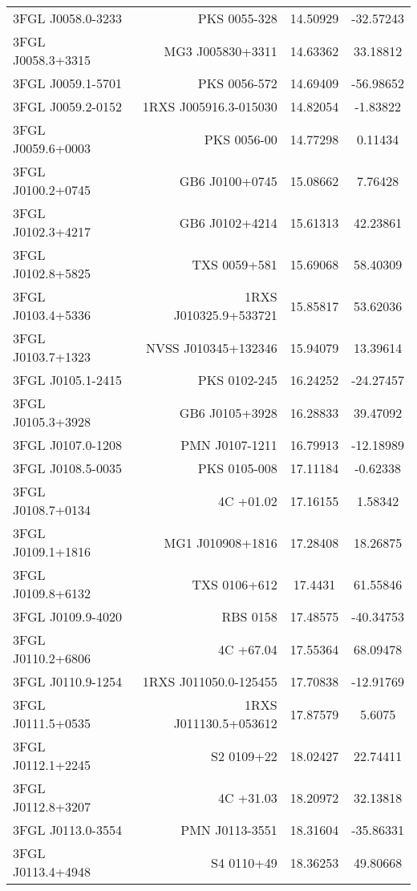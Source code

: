 \begin{table}
\begin{tabular}{l r c c}
3FGL J0058.0-3233  &  PKS 0055-328  &  14.50929  &  -32.57243  \\
3FGL J0058.3+3315  &  MG3 J005830+3311  &  14.63362  &  33.18812  \\
3FGL J0059.1-5701  &  PKS 0056-572  &  14.69409  &  -56.98652  \\
3FGL J0059.2-0152  &  1RXS J005916.3-015030  &  14.82054  &  -1.83822  \\
3FGL J0059.6+0003  &  PKS 0056-00  &  14.77298  &  0.11434  \\
3FGL J0100.2+0745  &  GB6 J0100+0745  &  15.08662  &  7.76428  \\
3FGL J0102.3+4217  &  GB6 J0102+4214  &  15.61313  &  42.23861  \\
3FGL J0102.8+5825  &  TXS 0059+581  &  15.69068  &  58.40309  \\
3FGL J0103.4+5336  &  1RXS J010325.9+533721  &  15.85817  &  53.62036  \\
3FGL J0103.7+1323  &  NVSS J010345+132346  &  15.94079  &  13.39614  \\
3FGL J0105.1-2415  &  PKS 0102-245  &  16.24252  &  -24.27457  \\
3FGL J0105.3+3928  &  GB6 J0105+3928  &  16.28833  &  39.47092  \\
3FGL J0107.0-1208  &  PMN J0107-1211  &  16.79913  &  -12.18989  \\
3FGL J0108.5-0035  &  PKS 0105-008  &  17.11184  &  -0.62338  \\
3FGL J0108.7+0134  &  4C +01.02  &  17.16155  &  1.58342  \\
3FGL J0109.1+1816  &  MG1 J010908+1816  &  17.28408  &  18.26875  \\
3FGL J0109.8+6132  &  TXS 0106+612  &  17.4431  &  61.55846  \\
3FGL J0109.9-4020  &  RBS 0158  &  17.48575  &  -40.34753  \\
3FGL J0110.2+6806  &  4C +67.04  &  17.55364  &  68.09478  \\
3FGL J0110.9-1254  &  1RXS J011050.0-125455  &  17.70838  &  -12.91769  \\
3FGL J0111.5+0535  &  1RXS J011130.5+053612  &  17.87579  &  5.6075  \\
3FGL J0112.1+2245  &  S2 0109+22  &  18.02427  &  22.74411  \\
3FGL J0112.8+3207  &  4C +31.03  &  18.20972  &  32.13818  \\
3FGL J0113.0-3554  &  PMN J0113-3551  &  18.31604  &  -35.86331  \\
3FGL J0113.4+4948  &  S4 0110+49  &  18.36253  &  49.80668  \\

\end{tabular}
\end{table}
